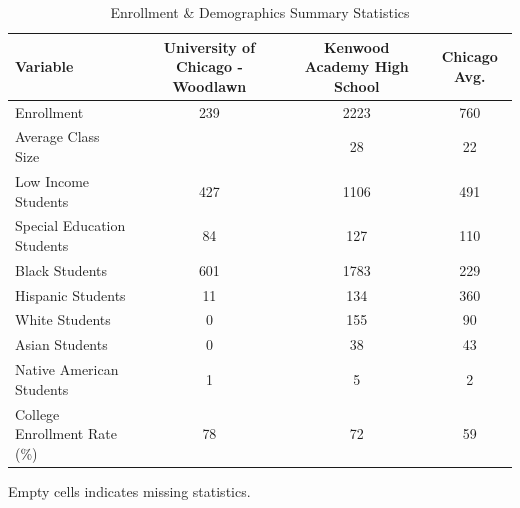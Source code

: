 \begin{table}[H]
\renewcommand{\arraystretch}{1.5}
\caption*{
{\large Enrollment \& Demographics Summary Statistics}
} 

\fontsize{10pt}{11pt}\selectfont

\begin{tabular*}{\linewidth}{@{\extracolsep{\fill}}lccc}
\toprule
Variable & University of Chicago - Woodlawn & Kenwood Academy High School & Chicago Avg. \\ 
\midrule\addlinespace[2.5pt]
Enrollment & 239 & 2223 & 760 \\
Average Class Size &  & 28 & 22 \\
Low Income Students & 427 & 1106 & 491 \\
Special Education Students & 84 & 127 & 110 \\
Black Students & 601 & 1783 & 229 \\
Hispanic Students & 11 & 134 & 360 \\
White Students & 0 & 155 & 90 \\
Asian Students & 0 & 38 & 43 \\
Native American Students & 1 & 5 & 2 \\
College Enrollment Rate (\%) & 78 & 72 & 59 \\
\bottomrule
\end{tabular*}
\begin{minipage}{\linewidth}
Empty cells indicates missing statistics.\\
\end{minipage}
\end{table}
